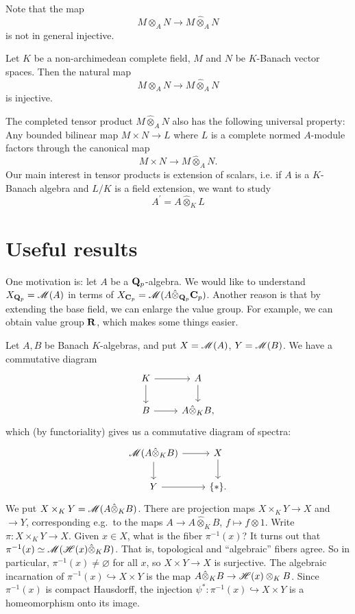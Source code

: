 Note that the map
\[
M\otimes_A N\to M\hat{\otimes}_AN
\]
is not in general injective.
\begin{theorem}[Gruson] Let $K$ be a non-archimedean complete field, $M$ and $N$ be $K$-Banach vector spaces. Then the natural map 
\[
  M\otimes_A N\to M\hat{\otimes}_AN
\]
is injective.
\end{theorem}
The completed tensor product $M\hat{\otimes}_AN$ also has the following universal property: Any bounded bilinear map $M\times N\to L$ where $L$ is a complete normed $A$-module factors through the canonical map
\[
M\times N\to M\hat{\otimes}_A N.
\]
Our main interest in tensor products is extension of scalars, i.e. if $A$ is a $K$-Banach algebra and $L/K$ is a field extension, we want to study
\[
A^\prime=A\hat{\otimes}_K L
\]










\section{Useful results}



One motivation is: let $A$ be a $\mathbf{Q}_p$-algebra. We would like to understand 
$X_{\mathbf{Q}_p}=\operatorname{\mathscr{M}}(A)$ in terms of 
$X_{\mathbf{C}_p} = \operatorname{\mathscr{M}}(A\hat\otimes_{\mathbf{Q}_p}\mathbf{C}_p)$. Another reason is that by 
extending the base field, we can enlarge the value group. For example, we can 
obtain value group $\mathbf{R}$, which makes some things easier. 

Let $A,B$ be Banach $K$-algebras, and put $X=\operatorname{\mathscr{M}}(A)$, $Y=\operatorname{\mathscr{M}}(B)$. 
We have a commutative diagram 
\[
\begin{tikzcd}
	K \ar[r] \ar[d]
		& A \ar[d] \\
	B \ar[r]
		& A\hat\otimes_K B ,
\end{tikzcd}
\]
which (by functoriality) gives us a commutative diagram of spectra:
\[
\begin{tikzcd}
	\Berkspec(A\hat\otimes_K B) \ar[r] \ar[d]
		& X \ar[d] \\
	Y \ar[r]
		& \{\ast\} .
\end{tikzcd}
\]
We put $X\times_K Y = \operatorname{\mathscr{M}}(A\hat\otimes_K B)$. There are projection maps 
$X\times_K Y\to X$ and $\to Y$, corresponding e.g.~to the maps 
$A\to A\hat\otimes_K B$, $f\mapsto f\otimes 1$. Write 
$\pi\colon X\times_K Y\to X$. Given $x\in X$, what is the fiber $\pi^{-1}(x)$? 
It turns out that $\pi^{-1}(x)\simeq\operatorname{\mathscr{M}}(\mathscr{H}(x)\hat\otimes_K B)$. That is, 
topological and ``algebraic'' fibers agree. So in particular, 
$\pi^{-1}(x)\ne\varnothing$ for all $x$, so $X\times Y\to X$ is surjective. The 
algebraic incarnation of $\pi^{-1}(x)\hookrightarrow X\times Y$ is the map 
$A\hat\otimes_K B\to \mathscr{H}(x)\otimes_K B$. Since $\pi^{-1}(x)$ is compact 
Hausdorff, the injection $\psi^\ast\colon\pi^{-1}(x)\hookrightarrow X\times Y$ 
is a homeomorphism onto its image. 

